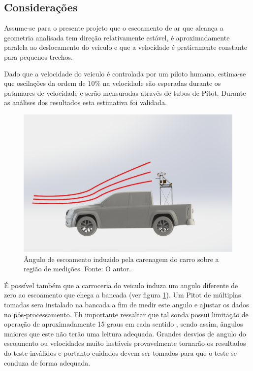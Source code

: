 \subsection{Considerações}

Assume-se para o presente projeto que o escoamento de ar que alcança a geometria analisada tem direção relativamente estável, é aproximadamente paralela ao deslocamento do veiculo e que a velocidade é praticamente constante para pequenos trechos.

Dado que a velocidade do veiculo é controlada por um piloto humano, estima-se que oscilações da ordem de 10\% na velocidade são esperadas durante os patamares de velocidade e serão mensuradas através de tubos de Pitot. Durante as análises dos resultados esta estimativa foi validada.

\begin{figure}[!ht]
    \centering
    \includegraphics[width=.8\linewidth]{figuras/renders/bancada_no_carro_lateral_induzido.png}
    \caption{Ângulo de escoamento induzido pela carenagem do carro sobre a região de medições. Fonte: O autor.}
    \label{fig:vehicle-angle}
\end{figure}

É possível também que a carroceria do veiculo induza um angulo diferente de zero ao escoamento que chega a bancada (ver figura \ref{fig:vehicle-angle}). Um Pitot de múltiplas tomadas sera instalado na bancada a fim de medir este angulo e ajustar os dados no pós-processamento. Eh importante ressaltar que tal sonda  possui limitação de operação de aproximadamente 15 graus em cada sentido \citep{azartash2017evaluation}, sendo assim, ângulos maiores que este não terão uma leitura adequada. Grandes desvios de angulo do escoamento ou velocidades muito instáveis provavelmente tornarão os resultados do teste inválidos e portanto cuidados devem ser tomados para que o teste se conduza de forma adequada.

